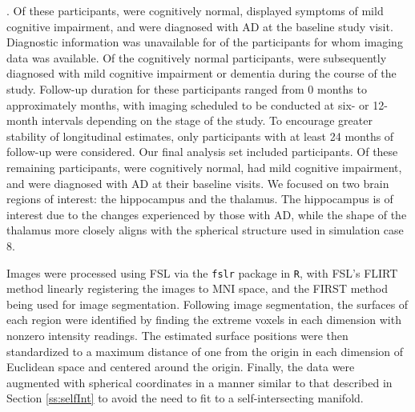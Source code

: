 \documentclass[12pt]{article}
\theoremstyle{definition}
\begin{document}
. Of these participants,  were cognitively normal,  displayed symptoms of mild cognitive impairment, and  were diagnosed with AD at the baseline study visit. Diagnostic information was unavailable for  of the  participants for whom imaging data was available. Of the  cognitively normal participants,  were subsequently diagnosed with mild cognitive impairment or dementia during the course of the study. Follow-up duration for these participants ranged from 0 months to approximately  months, with imaging scheduled to be conducted at six- or 12-month intervals depending on the stage of the study. To encourage greater stability of longitudinal estimates, only participants with at least 24 months of follow-up were considered. Our final analysis set included  participants. Of these remaining participants,  were cognitively normal,  had mild cognitive impairment, and  were diagnosed with AD at their baseline visits. We focused on two brain regions of interest: the hippocampus and the thalamus. The hippocampus is of interest due to the changes experienced by those with AD, while the shape of the thalamus more closely aligns with the spherical structure used in simulation case 8.

Images were processed using FSL via the \texttt{fslr} package \citep{muschelliFslrConnectingFSL2015} in \texttt{R}, with FSL's FLIRT method linearly registering the images to MNI space, and the FIRST method being used for image segmentation. Following image segmentation, the surfaces of each region were identified by finding the extreme voxels in each dimension with nonzero intensity readings. The estimated surface positions were then standardized to a maximum distance of one from the origin in each dimension of Euclidean space and centered around the origin. Finally, the data were augmented with spherical coordinates in a manner similar to that described in Section \ref{ss:selfInt} to avoid the need to fit to a self-intersecting manifold.
\end{document}
